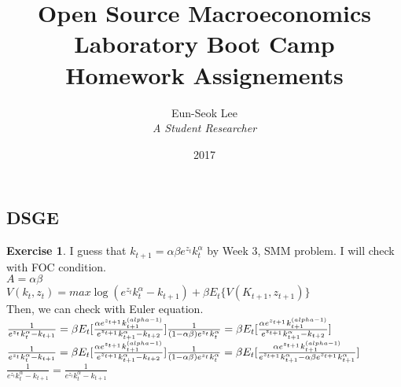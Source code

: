 \documentclass[letterpaper,12pt]{article}
\theoremstyle{definition}
\newtheorem{exercise}[theorem]{Exercise}
\begin{document}
\begin{titlepage}
	\title{Open Source Macroeconomics Laboratory Boot Camp \\ Homework Assignements}  %
	\author{Eun-Seok Lee\\ \emph{A Student Researcher}}
	\date{\LARGE{2017}}
	\maketitle
\end{titlepage}

\begin{spacing}{1.5}


\section*{DSGE}\label{DSGE_HW}

	\begin{exercise}
I guess that $k_{t+1} = \alpha \beta e^{z_t}k_t^{\alpha}$ by Week 3, SMM problem. I will check with FOC condition.\\
$A = \alpha\beta
$\\
$V(k_t, z_t) = max \log(e^{z_t}k_t^{\alpha} - k_{t+1}) + \beta E_t\{ V(K_{t+1}, z_{t+1}) \}
$\\
Then, we can check with Euler equation.\\
$\frac{1}{e^{z_t}k_t^{\alpha} - k_{t+1}} = \beta E_t [ \frac{\alpha e^{z_{t+1}}k_{t+1}^{(alpha -1)}} {e^{z_{t+1}}k_{t+1}^{\alpha} - k_{t+2}}] \\
\frac{1}{(1-\alpha\beta)e^{z_t}k_t^{\alpha} } = \beta E_t [ \frac{\alpha e^{z_{t+1}}k_{t+1}^{(alpha -1)}} {e^{z_{t+1}}k_{t+1}^{\alpha} - k_{t+2}}]
 $\\
$\frac{1}{e^{z_t}k_t^{\alpha} - k_{t+1}} = \beta E_t [ \frac{\alpha e^{z_{t+1}}k_{t+1}^{(alpha -1)}} {e^{z_{t+1}}k_{t+1}^{\alpha} - k_{t+2}}] \\
\frac{1}{(1-\alpha\beta)e^{z_t}k_t^{\alpha} } = \beta E_t [ \frac{\alpha e^{z_{t+1}}k_{t+1}^{(alpha -1)}} {e^{z_{t+1}}k_{t+1}^{\alpha} - \alpha \beta e^{z_{t+1}}k_{t+1}^{\alpha}}]
 $\\
$\frac{1}{e^{z_t}k_t^{\alpha} - k_{t+1}} = \frac{1}{e^{z_t}k_t^{\alpha} - k_{t+1}}
 $

	\end{exercise}


\end{spacing}
\end{document}

